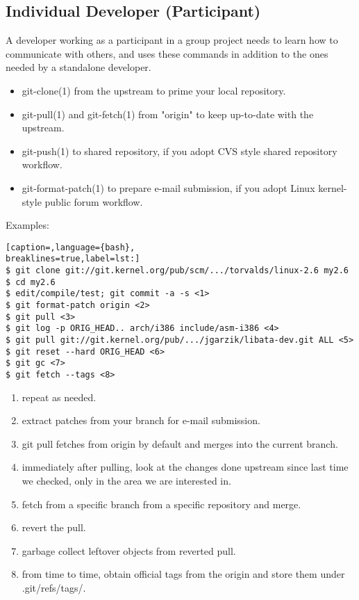 \subsection{Individual Developer (Participant)}
A developer working as a participant in a group project needs to learn how to
communicate with others, and uses these commands in addition to the ones needed
by a standalone developer.

\begin{itemize}
\setlength{\itemsep}{0cm}
\setlength{\parskip}{0cm}
\item git-clone(1) from the upstream to prime your local repository.
\item git-pull(1) and git-fetch(1) from "origin" to keep up-to-date with the
upstream.
\item git-push(1) to shared repository, if you adopt CVS style shared
repository workflow.
\item git-format-patch(1) to prepare e-mail submission, if you adopt Linux
kernel-style public forum workflow.
\end{itemize}

Examples:\\
\lstset{basicstyle=\scriptsize, numbers=none, captionpos=b, tabsize=4}
\begin{lstlisting}[caption=,language={bash},
breaklines=true,label=lst:]
$ git clone git://git.kernel.org/pub/scm/.../torvalds/linux-2.6 my2.6
$ cd my2.6
$ edit/compile/test; git commit -a -s <1>
$ git format-patch origin <2>
$ git pull <3>
$ git log -p ORIG_HEAD.. arch/i386 include/asm-i386 <4>
$ git pull git://git.kernel.org/pub/.../jgarzik/libata-dev.git ALL <5>
$ git reset --hard ORIG_HEAD <6>
$ git gc <7>
$ git fetch --tags <8>
\end{lstlisting}

\begin{enumerate}
\setlength{\itemsep}{0cm}
\setlength{\parskip}{0cm}
\item repeat as needed.
\item extract patches from your branch for e-mail submission.
\item git pull fetches from origin by default and merges into the current
branch.
\item immediately after pulling, look at the changes done upstream since last
time we checked, only in the area we are interested in.
\item fetch from a specific branch from a specific repository and merge.
\item revert the pull.
\item garbage collect leftover objects from reverted pull.
\item from time to time, obtain official tags from the origin and store them under .git/refs/tags/.
\end{enumerate}
